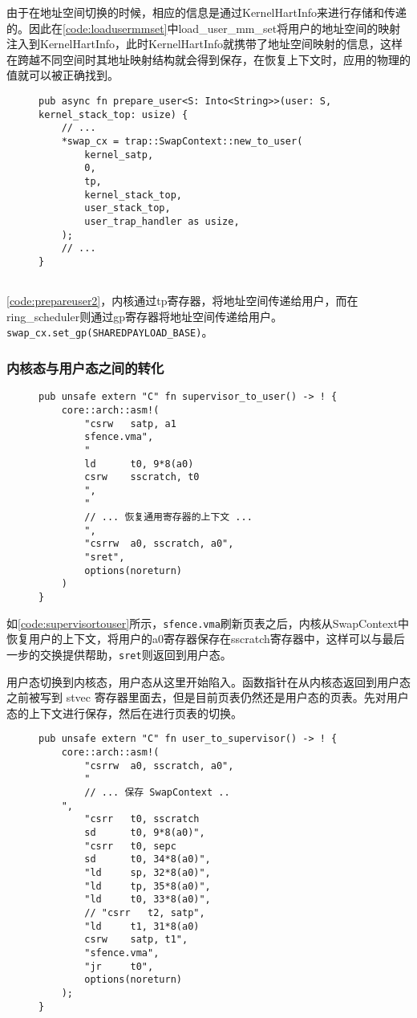 由于在地址空间切换的时候，相应的信息是通过KernelHartInfo来进行存储和传递的。因此在\autoref{code:loadusermmset}中load\_user\_mm\_set将用户的地址空间的映射注入到KernelHartInfo，此时KernelHartInfo就携带了地址空间映射的信息，这样在跨越不同空间时其地址映射结构就会得到保存，在恢复上下文时，应用的物理的值就可以被正确找到。

\begin{figure}[h]
\begin{lstlisting}[caption=将地址空间信息传递给用户, label=code:prepareuser2]
pub async fn prepare_user<S: Into<String>>(user: S, kernel_stack_top: usize) {
    // ...
    *swap_cx = trap::SwapContext::new_to_user(
        kernel_satp,
        0,
        tp,
        kernel_stack_top,
        user_stack_top,
        user_trap_handler as usize,
    );
    // ...
}
    
\end{lstlisting}
\end{figure}

\autoref{code:prepareuser2}，内核通过tp寄存器，将地址空间传递给用户，而在ring\_scheduler则通过gp寄存器将地址空间传递给用户。\verb|swap_cx.set_gp(SHAREDPAYLOAD_BASE)|。


\subsubsection{内核态与用户态之间的转化}
\begin{figure}[h]
\begin{lstlisting}[caption=由内核态进入用户态, label=code:supervisortouser]
pub unsafe extern "C" fn supervisor_to_user() -> ! {
    core::arch::asm!(
        "csrw   satp, a1
        sfence.vma",
        "
        ld      t0, 9*8(a0)
        csrw    sscratch, t0
        ",
        "
        // ... 恢复通用寄存器的上下文 ...
        ",
        "csrrw  a0, sscratch, a0",
        "sret",
        options(noreturn)
    )
}
\end{lstlisting}
\end{figure}

如\autoref{code:supervisortouser}所示，\verb|sfence.vma|刷新页表之后，内核从SwapContext中恢复用户的上下文，将用户的a0寄存器保存在sscratch寄存器中，这样可以与最后一步的交换提供帮助，\verb|sret|则返回到用户态。


用户态切换到内核态，用户态从这里开始陷入。函数指针在从内核态返回到用户态之前被写到 stvec 寄存器里面去，但是目前页表仍然还是用户态的页表。先对用户态的上下文进行保存，然后在进行页表的切换。
\begin{figure}[h]
\begin{lstlisting}[caption=由用户态进入内核态, label=code:usertosupervisor]
pub unsafe extern "C" fn user_to_supervisor() -> ! {
    core::arch::asm!(
        "csrrw  a0, sscratch, a0",
        "
        // ... 保存 SwapContext ..
    ",
        "csrr   t0, sscratch
        sd      t0, 9*8(a0)",
        "csrr   t0, sepc
        sd      t0, 34*8(a0)",
        "ld     sp, 32*8(a0)",
        "ld     tp, 35*8(a0)",
        "ld     t0, 33*8(a0)",
        // "csrr   t2, satp",
        "ld     t1, 31*8(a0)
        csrw    satp, t1",
        "sfence.vma",
        "jr     t0",
        options(noreturn)
    );
}
\end{lstlisting}
\end{figure}

